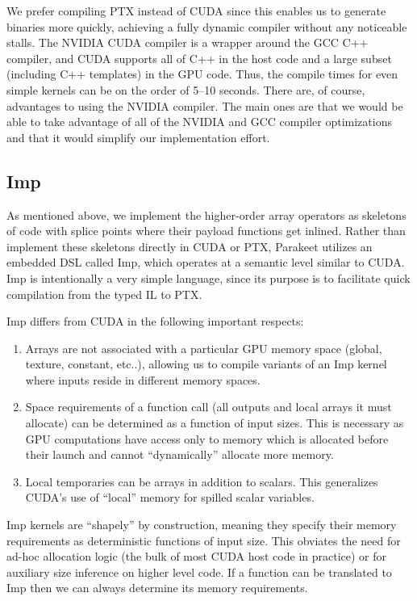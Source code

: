 \documentclass[preprint]{sigplanconf}
\begin{document}
We prefer compiling PTX instead of CUDA since this enables us to generate binaries more quickly, achieving a fully dynamic compiler without any noticeable stalls. The NVIDIA CUDA compiler is a wrapper around the GCC C++ compiler, and CUDA supports all of C++ in the host code and a large subset (including C++ templates) in the GPU code.  Thus, the compile times for even simple kernels can be on the order of 5--10 seconds.  There are, of course, advantages to using the NVIDIA compiler. The main ones are that we would be able to take advantage of all of the NVIDIA and GCC compiler optimizations and that it would simplify our implementation effort.  

\subsection{Imp}
\label{Imp}
As mentioned above, we implement the higher-order array operators as skeletons of code with splice points where their payload functions get inlined.  Rather than implement these skeletons directly in CUDA or PTX, Parakeet utilizes an embedded DSL called Imp, which operates at a semantic level similar to CUDA. Imp is intentionally a very simple language, since its purpose is to facilitate quick compilation from the typed IL to PTX. 

Imp differs from CUDA in the following important respects:

\begin{enumerate}
\item  Arrays are not associated with a particular GPU memory space (global, texture, constant, etc..), allowing us to compile variants of an Imp kernel where inputs reside in different memory spaces.

\item Space requirements of a function call (all outputs and local arrays it must allocate) can be determined as a function of input sizes. This is necessary as GPU computations have access only to memory which is allocated before their launch and cannot ``dynamically'' allocate more memory.

\item Local temporaries can be arrays in addition to scalars. This generalizes CUDA's use of ``local'' memory for spilled scalar variables.
\end{enumerate}
Imp kernels are ``shapely'' by construction, meaning they specify their memory requirements as deterministic functions of input size. This obviates the need for ad-hoc allocation logic (the bulk of most CUDA host code in practice) or for auxiliary size inference on higher level code. If a function can be translated to Imp then we can always determine its memory requirements.
\end{document}

